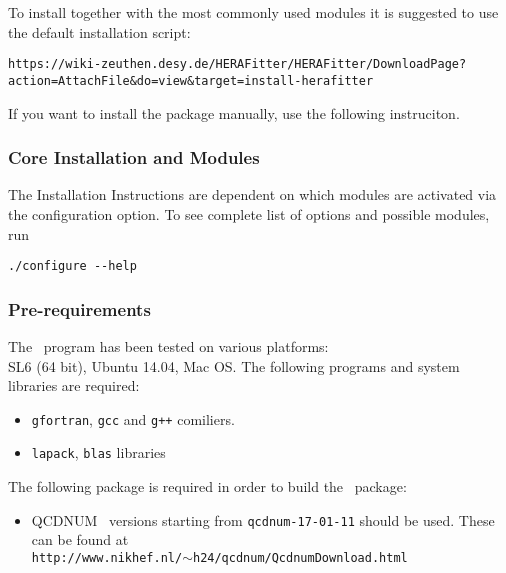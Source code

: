 
\label{sec:install}

To install {\fitter} together with the most commonly used modules it is suggested to use the default installation script:

{\scriptsize
{\tt https://wiki-zeuthen.desy.de/HERAFitter/HERAFitter/DownloadPage?action=AttachFile\&do=view\&target=install-herafitter}
}

If you want to install the package manually, use the following instruciton.

\subsubsection{Core Installation and Modules}
The Installation Instructions are dependent on which modules are activated via the configuration option. To see complete list of options and possible
modules, run
\begin{verbatim}
./configure --help
\end{verbatim}
\subsubsection{Pre-requirements}

The \fitter\ program has been tested on various platforms:\\
 SL6 (64 bit),  Ubuntu 14.04, Mac OS.  The following programs and system libraries are required:
\begin{itemize}
 \item {\tt gfortran}, {\tt gcc} and {\tt g++}  comiliers.   
 \item {\tt lapack}, {\tt blas} libraries
\end{itemize}

The following package is required in order to build the \fitter\ package:
\begin{itemize}
\item QCDNUM~\cite{qcdnum} versions starting from {\tt qcdnum-17-01-11} should be used. These can be found at \\
  {\tt http://www.nikhef.nl/$\sim$h24/qcdnum/QcdnumDownload.html}
\end{itemize}

